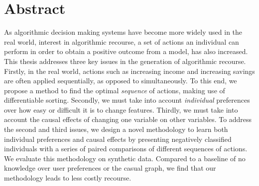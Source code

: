 \clearpage
{
    \pagestyle{abstract}
    \chapter*{Abstract}
      As algorithmic decision making systems have become more widely used in the real world, interest in algorithmic recourse, a set of actions an individual can perform in order to obtain a positive outcome from a model, has also increased. This thesis addresses three key issues in the generation of algorithmic recourse. Firstly, in the real world, actions such as increasing income and increasing savings are often applied sequentially, as opposed to simultaneously. To this end, we propose a method to find the optimal \textit{sequence} of actions, making use of differentiable sorting. Secondly, we must take into account \textit{individual} preferences over how easy or difficult it is to change features. Thirdly, we must take into account the causal effects of changing one variable on other variables. To address the second and third issues, we design a novel methodology to learn both individual preferences and causal effects by presenting negatively classified individuals with a series of paired comparisons of different sequences of actions. We evaluate this methodology on synthetic data. Compared to a baseline of no knowledge over user preferences or the casual graph, we find that our methodology leads to less costly recourse.    
    \thispagestyle{abstract}
}
\newpage
